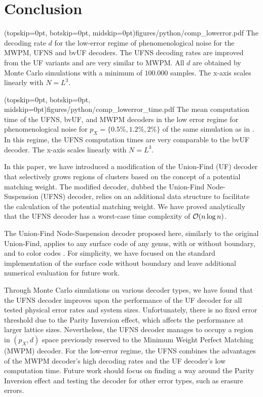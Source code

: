 \section{Conclusion}\label{sec:conclusion}

\Figure[b!](topskip=0pt, botskip=0pt, midskip=0pt){figures/python/comp_lowerror.pdf}{
  The decoding rate $d$ for the low-error regime of phenomenological noise for the MWPM, UFNS and bvUF decoders. The UFNS decoding rates are improved from the UF variants and are very similar to MWPM. All $d$ are obtained by Monte Carlo simulations with a minimum of $100.000$ samples. The x-axis scales linearly with $N = L^3$.\label{comp_lowerror}}

\Figure[b!](topskip=0pt, botskip=0pt, midskip=0pt){figures/python/comp_lowerror_time.pdf}{
  The mean computation time of the UFNS, bvUF, and MWPM decoders in the low error regime for phenomenological noise for $p_X = \{0.5\%, 1.2\%, 2\%\}$ of the same simulation as in . In this regime, the UFNS computation times are very comparable to the bvUF decoder. The x-axis scales linearly with $N = L^3$. \label{comp_lowerror_time}}

In this paper, we have introduced a modification of the Union-Find (UF) decoder \cite{delfosse2017almost} that selectively grows regions of clusters based on the concept of a potential matching weight. The modified decoder, dubbed the Union-Find Node-Suspension (UFNS) decoder, relies on an additional data structure to facilitate the calculation of the potential matching weight. We have proved analytically that the UFNS decoder has a worst-case time complexity of $\mathcal{O}(n\log{n})$. 

The Union-Find Node-Suspension decoder proposed here, similarly to the original Union-Find, applies to any surface code of any genus, with or without boundary, and to color codes \cite{delfosse2017almost}. For simplicity, we have focused on the standard implementation of the surface code without boundary and leave additional numerical evaluation for future work.

Through Monte Carlo simulations on various decoder types, we have found that the UFNS decoder improves upon the performance of the UF decoder for all tested physical error rates and system sizes. Unfortunately, there is no fixed error threshold due to the Parity Inversion effect, which affects the performance at larger lattice sizes. Nevertheless, the UFNS decoder manages to occupy a region in $(p_X, d)$ space previously reserved to the Minimum Weight Perfect Matching (MWPM) decoder. For the low-error regime, the UFNS combines the advantages of the MWPM decoder's high decoding rates and the UF decoder's low computation time. Future work should focus on finding a way around the Parity Inversion effect and testing the decoder for other error types, such as erasure errors. 

